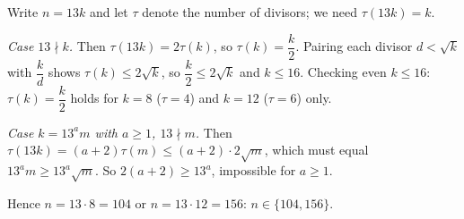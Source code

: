 Write $n=13k$ and let $\tau$ denote the number of divisors; we need $\tau(13k)=k$.

\emph{Case $13\nmid k$.} Then $\tau(13k)=2\tau(k)$, so $\tau(k)=\dfrac k2$. Pairing each divisor $d<\sqrt k$ with $\dfrac kd$ shows $\tau(k)\le2\sqrt k$, so $\dfrac k2\le2\sqrt k$ and $k\le16$. Checking even $k\le16$: $\tau(k)=\dfrac k2$ holds for $k=8$ ($\tau=4$) and $k=12$ ($\tau=6$) only.

\emph{Case $k=13^am$ with $a\ge1$, $13\nmid m$.} Then $\tau(13k)=(a+2)\tau(m)\le(a+2)\cdot2\sqrt m$, which must equal $13^am\ge13^a\sqrt m$. So $2(a+2)\ge13^a$, impossible for $a\ge1$.

Hence $n=13\cdot8=104$ or $n=13\cdot12=156$: $\boxed{n\in\{104,156\}}$.
